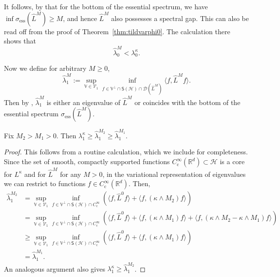 \documentclass{aptpub}
\newcommand{\Rd}{\mathbb R^d}
\newcommand{\Lk}{L^\kappa}
\newcommand{\Dom}{\mathcal D}
\renewcommand{\H}{\mathcal H}
\begin{document}
\begin{remark}
    It follows, by \cite[Lemma~14.4.1]{Davies2007} that for the bottom of the essential spectrum, we have $\inf \sigma_\mathrm{ess}(\widehat{L}^M)\ge M$, and hence $\widehat{L}^M$ also possesses a spectral gap. This can also be read off from the proof of Theorem~\ref{thm:tildvarphi0}. The calculation there shows that
    \begin{equation*}
        \widehat{\lambda}_0^M < \lambda_0^\kappa.
    \end{equation*}
\end{remark}

    Now we define for arbitrary $M\geq 0$,
\begin{equation*}
    \widehat\lambda_1^M := \sup_{\mathbb V \in \mathcal V_1} \inf_{f\in \mathbb V^\perp \cap \mathsf S(\H)\cap \Dom(\widehat L^M)} \langle f, \widehat  L^M f\rangle.
\end{equation*}
Then by \cite[Theorem XIII.1]{Reed1978}, $\widehat  \lambda_1^M$ is either an eigenvalue of $\widehat  L^M$ or coincides with the bottom of the essential spectrum $\sigma_\mathrm{ess}(\widehat  L^M)$.

\begin{proposition}
    Fix $M_2>M_1>0$. Then $\lambda_1^\kappa\ge\widehat \lambda_1^{M_2} \ge \widehat \lambda_1^{M_1}$.
    \label{prop:monoton_eval}
\end{proposition}
\begin{proof}
    This follows from a routine calculation, which we include for completeness. Since the set of smooth, compactly supported functions $C_\mathrm c^\infty(\Rd)\subset \H$ is a core for $\Lk$ and for $\widehat L^M$ for any $M>0$, in the variational representation of eigenvalues we can restrict to functions $f\in C_\mathrm c^\infty(\Rd)$.
    Then,
    \begin{equation*}
        \begin{split}
            \widehat \lambda_1^{M_2} &= \sup_{\mathbb V \in \mathcal V_1} \inf_{f\in \mathbb V^\perp \cap \mathsf S(\H)\cap C_\mathrm c^\infty}
            \left (\langle f,\widehat L^0 f\rangle + \langle f,(\kappa \wedge M_2)f\rangle \right )\\
            &= \sup_{\mathbb V \in \mathcal V_1} \inf_{f\in \mathbb V^\perp \cap \mathsf S(\H)\cap C_\mathrm c^\infty}
            \left ( \langle f,\widehat L^0 f\rangle + \langle f,(\kappa \wedge M_1)f\rangle + \langle f, (\kappa\wedge M_2 - \kappa \wedge M_1)f\rangle \right)\\
            &\ge \sup_{\mathbb V \in \mathcal V_1} \inf_{f\in \mathbb V^\perp \cap \mathsf S(\H)\cap C_\mathrm c^\infty}
            \left ( \langle f,\widehat L^0 f\rangle + \langle f,(\kappa \wedge M_1)f\rangle  \right)\\
            &= \widehat \lambda_1^{M_1}.
        \end{split}
    \end{equation*}
    An analogous argument also 
    gives
    $\lambda_1^\kappa\ge\widehat \lambda_1^{M_2}$.
\end{proof}
\end{document}
